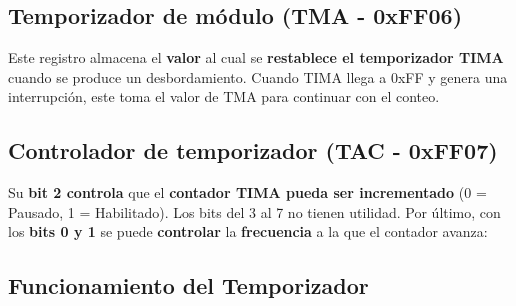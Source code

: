 \subsection{Temporizador de módulo (TMA - 0xFF06)}
Este registro almacena el \textbf{valor} al cual se \textbf{restablece el temporizador TIMA} cuando se produce un desbordamiento. Cuando TIMA llega a 0xFF y genera una interrupción, este toma el valor de TMA para continuar con el conteo.

\subsection{Controlador de temporizador (TAC - 0xFF07)}
Su \textbf{bit 2 controla} que el \textbf{contador TIMA pueda ser incrementado} (0 = Pausado, 1 = Habilitado). Los bits del 3 al 7 no tienen utilidad. Por último, con los \textbf{bits 0 y 1} se puede \textbf{controlar} la \textbf{frecuencia} a la que el contador avanza:

\begin{table}[h!]
    \centering
    \caption{Selección de modos de reloj y sus frecuencias.}
\end{table}

\subsection{Funcionamiento del Temporizador}

